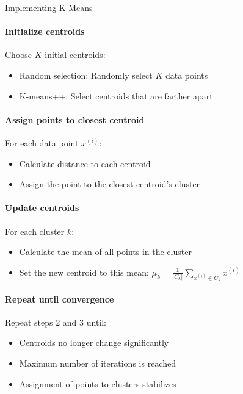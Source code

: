 \begin{KR}{Implementing K-Means}
\paragraph{Initialize centroids}
Choose $K$ initial centroids:
\begin{itemize}
    \item Random selection: Randomly select $K$ data points
    \item K-means++: Select centroids that are farther apart
\end{itemize}

\paragraph{Assign points to closest centroid}
For each data point $x^{(i)}$:
\begin{itemize}
    \item Calculate distance to each centroid
    \item Assign the point to the closest centroid's cluster
\end{itemize}

\paragraph{Update centroids}
For each cluster $k$:
\begin{itemize}
    \item Calculate the mean of all points in the cluster
    \item Set the new centroid to this mean: $\mu_k = \frac{1}{|C_k|} \sum_{x^{(i)} \in C_k} x^{(i)}$
\end{itemize}

\paragraph{Repeat until convergence}
Repeat steps 2 and 3 until:
\begin{itemize}
    \item Centroids no longer change significantly
    \item Maximum number of iterations is reached
    \item Assignment of points to clusters stabilizes
\end{itemize}
\end{KR}

